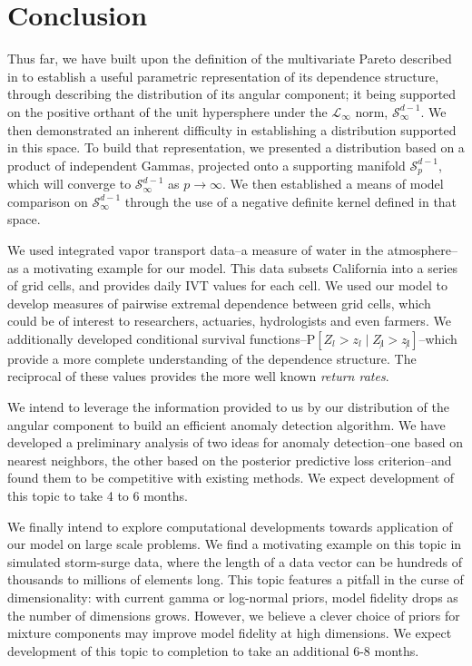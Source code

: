 
\section{Conclusion}
Thus far, we have built upon the definition of the multivariate Pareto described in \cite{ferreira2014}
  to establish a useful parametric representation of its dependence structure, through describing the distribution of its angular component; it being supported on the positive orthant of the unit 
  hypersphere under the $\mathcal{L}_{\infty}$ norm, $\mathcal{S}_{\infty}^{d-1}$.  We then demonstrated an
  inherent difficulty in establishing a distribution supported in this space.  To build that representation,
  we presented a distribution based on a product of independent Gammas, projected onto a supporting manifold
  $\mathcal{S}_{p}^{d-1}$, which will converge to $\mathcal{S}_{\infty}^{d-1}$ as $p\to\infty$.  We then
  established a means of model comparison on $\mathcal{S}_{\infty}^{d-1}$ through the use of a negative
  definite kernel defined in that space.

We used integrated vapor transport data--a measure of water in the atmosphere--as a motivating example for
  our model.  This data subsets California into a series of grid cells, and provides daily IVT values for
  each cell.  We used our model to develop measures of pairwise extremal dependence between grid cells, which
  could be of interest to researchers, actuaries, hydrologists and even farmers.  We additionally developed
  conditional survival functions--$\text{P}\left[Z_l > z_l\mid Z_{\not l} > z_{\not l}\right]$--which provide a more complete understanding of the dependence structure.  The reciprocal of these values provides the more well known \emph{return rates}.

We intend to leverage the information provided to us by our distribution of the angular component to build
  an efficient anomaly detection algorithm.  We have developed a preliminary analysis of two ideas for
  anomaly detection--one based on nearest neighbors, the other based on the posterior predictive loss criterion--and found them to be competitive with existing methods.  We expect development of this topic to take 4 to 6 months.

We finally intend to explore computational developments towards application of our model on large scale
  problems.  We find a motivating example on this topic in simulated storm-surge data, where the length of 
  a data vector can be hundreds of thousands to millions of elements long.  This topic features a pitfall in the curse of dimensionality: with current gamma or log-normal priors, model fidelity drops as the number of dimensions grows.  However, we believe a clever choice of priors for mixture components may improve model fidelity at high dimensions.  We expect development of this topic to completion to take an additional 6-8 months.

